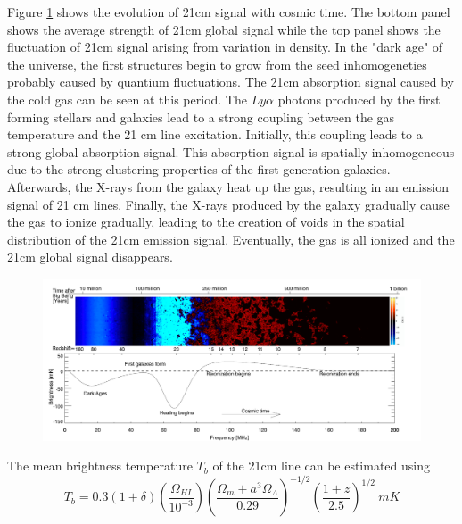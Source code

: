 \documentclass{article}
\begin{document}
Figure \ref{historyofHI} shows the evolution of 21cm signal with cosmic time. The bottom panel shows the average strength of 21cm global signal while the top panel shows the fluctuation of 21cm signal arising
from variation in density. In the "dark age" of the universe, the first structures begin to grow from the seed inhomogeneties probably caused by quantium 
fluctuations. The 21cm absorption signal caused by the cold gas can be seen at this period. The $Ly\alpha$ photons produced by the first forming stellars and galaxies lead to a strong coupling between the gas temperature and the 21 cm line excitation. Initially, this coupling leads to a strong global absorption signal. This absorption signal is spatially inhomogeneous due to the strong clustering properties of the first generation galaxies. Afterwards, the X-rays from the galaxy heat up the gas, resulting in an emission signal of 21 cm lines. Finally, the X-rays produced by the galaxy gradually cause the gas to ionize gradually, leading to the creation of voids in the spatial distribution of the 21cm emission signal. Eventually, the gas is all ionized and the 21cm global signal disappears.

\begin{figure}
    \centering
    \includegraphics[scale=0.3]{history1.png}
    \caption{}
    \label{historyofHI}
\end{figure}

The mean brightness temperature $T_b$ of the 21cm line can be estimated using 
\begin{equation}
    T_b = 0.3(1+\delta)(\frac{\Omega_{HI}}{10^{-3}})(\frac{\Omega_m+a^3\Omega_\Lambda}{0.29})^{-1/2}(\frac{1+z}{2.5})^{1/2}\ mK
\end{equation}
\end{document}
